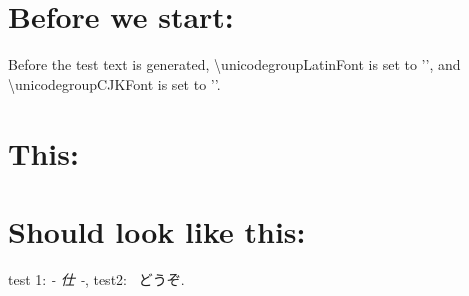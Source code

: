 ﻿\documentclass[12pt]{article}
\begin{document}
  
  

  \section{Before we start:}


  Before the test text is generated, \textbackslash unicodegroupLatinFont is set to '\unicodegroupLatinFont',
   and \textbackslash unicodegroupCJKFont is set to '\unicodegroupCJKFont'.



  \section{This:}


  \section{Should look like this:}

  \fontspec{\unicodegroupLatinFont}test 1: \emph{- 仕 -},  test2: \ \fontspec{\unicodegroupCJKFont}どうぞ\fontspec{\unicodegroupLatinFont}.


\end{document}
